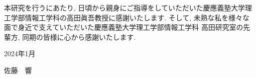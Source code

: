\acknowledge


本研究を行うにあたり, 日頃から親身にご指導をしていただいた慶應義塾大学理工学部情報工学科の高田眞吾教授に感謝いたします.
そして, 未熟な私を様々な面で身近で支えていただいた慶應義塾大学理工学部情報工学科 高田研究室の先輩方, 同期の皆様に心から感謝いたします. 


2024年1月 
\begin{flushright}
  {\Large 佐藤　響}
\end{flushright}